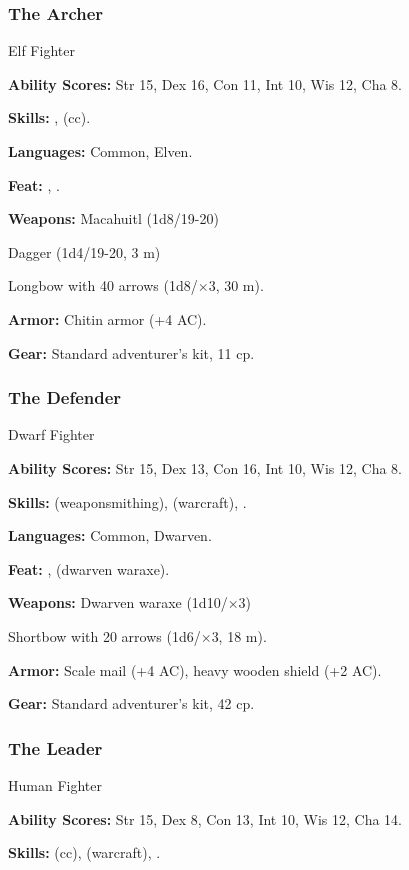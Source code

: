 \subsubsection{The Archer}

Elf Fighter

\textbf{Ability Scores:} Str 15, Dex 16, Con 11, Int 10, Wis 12, Cha 8.

\textbf{Skills:} ,  (cc).

\textbf{Languages:} Common, Elven.

\textbf{Feat:} , .

\textbf{Weapons:} Macahuitl (1d8/19-20)

Dagger (1d4/19-20, 3 m)

Longbow with 40 arrows (1d8/$\times$3, 30 m).

\textbf{Armor:} Chitin armor (+4 AC).

\textbf{Gear:} Standard adventurer's kit, 11 cp.

\subsubsection{The Defender}

Dwarf Fighter

\textbf{Ability Scores:} Str 15, Dex 13, Con 16, Int 10, Wis 12, Cha 8.

\textbf{Skills:}  (weaponsmithing),  (warcraft), .

\textbf{Languages:} Common, Dwarven.

\textbf{Feat:} ,  (dwarven waraxe).

\textbf{Weapons:} Dwarven waraxe (1d10/$\times$3)

Shortbow with 20 arrows (1d6/$\times$3, 18 m).

\textbf{Armor:} Scale mail (+4 AC), heavy wooden shield (+2 AC).

\textbf{Gear:} Standard adventurer's kit, 42 cp.

\subsubsection{The Leader}

Human Fighter

\textbf{Ability Scores:} Str 15, Dex 8, Con 13, Int 10, Wis 12, Cha 14.

\textbf{Skills:}  (cc),  (warcraft), .

